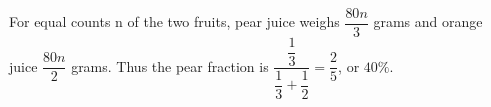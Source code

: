 For equal counts n of the two fruits, pear juice weighs $\dfrac{80n}{3}$ grams and orange juice $\dfrac{80n}{2}$ grams. Thus the pear fraction is $\dfrac{\dfrac{1}{3}}{\dfrac{1}{3}+\dfrac{1}{2}}=\dfrac{2}{5}$, or $\boxed{40\%}$.
